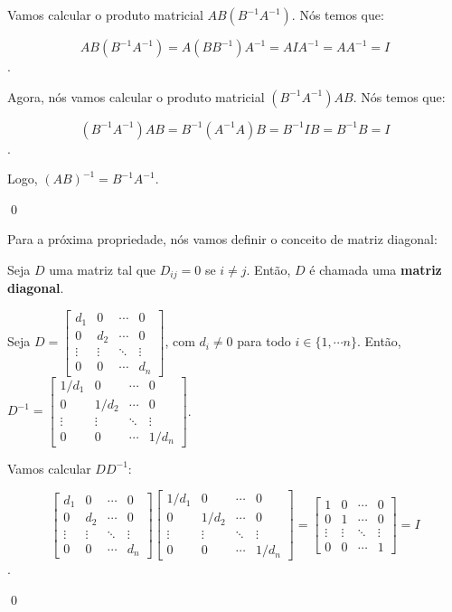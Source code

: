 \begin{Proof}
	Vamos calcular o produto matricial $AB(B^{-1}A^{-1})$. Nós temos que:
	
	$$
	AB(B^{-1}A^{-1}) = A(BB^{-1})A^{-1} = AIA^{-1} = AA^{-1} = I
	$$.
	
	Agora, nós vamos calcular o produto matricial $(B^{-1}A^{-1})AB$. Nós temos que:
	
	$$
	(B^{-1}A^{-1})AB = B^{-1}(A^{-1}A)B = B^{-1}IB = B^{-1}B = I
	$$.
	
	Logo, $(AB)^{-1} = B^{-1}A^{-1}$.
	
	\qed
\end{Proof}

Para a próxima propriedade, nós vamos definir o conceito de matriz diagonal:

\begin{Definition}
	Seja $D$ uma matriz tal que $D_{ij} = 0$ se $i\neq j$. Então, $D$ é chamada uma \textbf{matriz diagonal}.
\end{Definition}

\begin{Proposition}
	Seja $D = \begin{bmatrix}
		d_1 & 0 & \cdots & 0 \\
		0 & d_2 & \cdots & 0 \\
		\vdots & \vdots & \ddots & \vdots \\
		0 & 0 & \cdots & d_n
	\end{bmatrix}$, com $d_i\neq 0$ para todo $i\in\{1, \cdots n\}$. Então, $D^{-1} = \begin{bmatrix}
		1/d_1 & 0 & \cdots & 0 \\
		0 & 1/d_2 & \cdots & 0 \\
		\vdots & \vdots & \ddots & \vdots \\
		0 & 0 & \cdots & 1/d_n
	\end{bmatrix}$.
\end{Proposition}

\begin{Proof}
	Vamos calcular $DD^{-1}$:
	
	$$
	\begin{bmatrix}
		d_1 & 0 & \cdots & 0 \\
		0 & d_2 & \cdots & 0 \\
		\vdots & \vdots & \ddots & \vdots \\
		0 & 0 & \cdots & d_n
	\end{bmatrix}
	\begin{bmatrix}
		1/d_1 & 0 & \cdots & 0 \\
		0 & 1/d_2 & \cdots & 0 \\
		\vdots & \vdots & \ddots & \vdots \\
		0 & 0 & \cdots & 1/d_n
	\end{bmatrix} =
	\begin{bmatrix}
		1 & 0 & \cdots & 0 \\
		0 & 1 & \cdots & 0 \\
		\vdots & \vdots & \ddots & \vdots \\
		0 & 0 & \cdots & 1
	\end{bmatrix} = I
	$$.
	
	\qed
\end{Proof}

